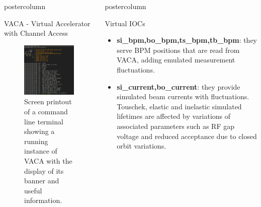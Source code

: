 \documentclass[20pt]{beamer}
\newlength{\columnheight}
\begin{document}
\begin{frame}
\begin{columns}
\begin{column}{0.45\textwidth}
\begin{beamercolorbox}[center]{postercolumn}
\begin{minipage}{.98\textwidth}
{\begin{myblock}{VACA - Virtual Accelerator with Channel Access}
\begin{figure}
							\centering
							\includegraphics[width=1.0\textwidth]{../WEPOPRPO21f1.png}
							\caption{Screen printout of a command line terminal showing a running instance of VACA with the display of its banner and useful information.}
						\end{figure}
					\end{myblock}
		}\end{minipage}\end{beamercolorbox}
	\end{column}
	\begin{column}{.55\textwidth}
		\begin{beamercolorbox}[center]{postercolumn}
			\begin{minipage}{.98\textwidth} %
				\parbox[t][\columnheight]{\textwidth}{ %
					\begin{myblock}{Virtual IOCs}
					\begin{itemize}
					\item \textbf{si\_bpm,bo\_bpm,ts\_bpm,tb\_bpm}: they serve BPM positions that are read from VACA, adding emulated measurement fluctuations.
					\item \textbf{si\_current,bo\_current}: they provide simulated beam currents with fluctuations. Touschek, elastic and inelastic simulated lifetimes are affected by variations of associated parameters such as RF gap voltage and reduced acceptance due to closed orbit variations.

\end{itemize}
\end{myblock}}
\end{minipage}
\end{beamercolorbox}
\end{column}
\end{columns}
\end{frame}
\end{document}

